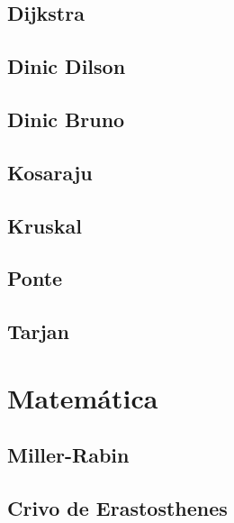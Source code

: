 \documentclass[12pt, a4paper, twoside]{article}
\begin{document}
\subsection{Dijkstra}


\subsection{Dinic Dilson}


\subsection{Dinic Bruno}


\subsection{Kosaraju}


\subsection{Kruskal}


\subsection{Ponte}


\subsection{Tarjan}




%
%

\section{Matemática}

\subsection{Miller-Rabin}


\subsection{Crivo de Erastosthenes}

\end{document}
